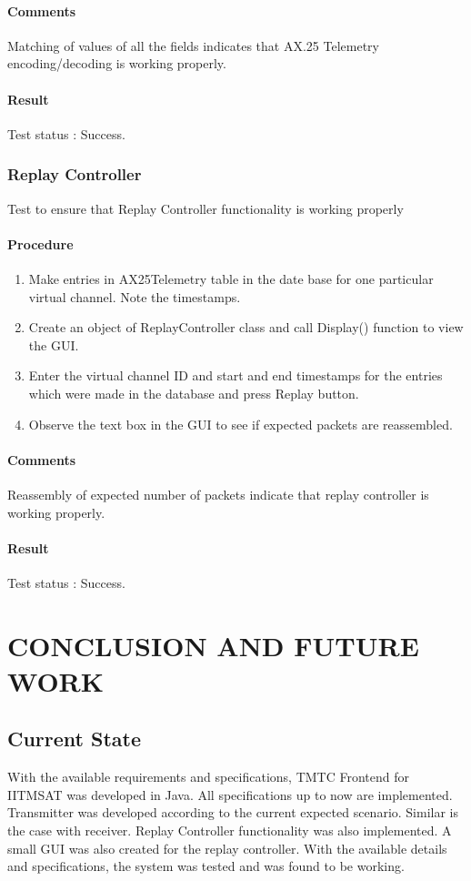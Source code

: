 \documentclass[BTech]{iitmdiss}
\begin{document}
\subsubsection{Comments}
Matching of values of all the fields indicates that AX.25 Telemetry encoding/decoding is working properly.
\subsubsection{Result}
Test status : Success.

\subsection{Replay Controller}
Test to ensure that Replay Controller functionality is working properly
\subsubsection{Procedure}
\begin{enumerate}
\item Make entries in AX25Telemetry table in the date base for one particular virtual channel. Note the timestamps.
\item Create an object of ReplayController class and call Display() function to view the GUI.
\item Enter the virtual channel ID and start and end timestamps for the entries which were made in the database and press Replay button.
\item Observe the text box in the GUI to see if expected packets are reassembled.

\end{enumerate}

\subsubsection{Comments}
Reassembly of expected number of packets indicate that replay controller is working properly.
\subsubsection{Result}
Test status : Success.

\chapter{CONCLUSION AND FUTURE WORK }
\section{Current State}
With the available requirements and specifications, TMTC Frontend for IITMSAT was developed in Java. All specifications up to now are implemented. Transmitter was developed according to the current expected scenario. Similar is the case with receiver. Replay Controller functionality was also implemented. A small GUI was also created for the replay controller. With the available details and specifications, the system was tested and was found to be working. 
\end{document}
